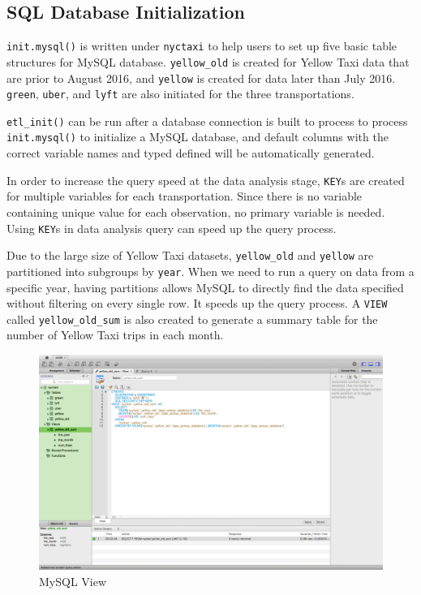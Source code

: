 \documentclass[12pt,twoside]{reedthesis}
\newenvironment{Shaded}{\begin{snugshade}}{\end{snugshade}}
\newcommand{\KeywordTok}[1]{\textcolor[rgb]{0.13,0.29,0.53}{\textbf{#1}}}
\newcommand{\StringTok}[1]{\textcolor[rgb]{0.31,0.60,0.02}{#1}}
\newcommand{\OperatorTok}[1]{\textcolor[rgb]{0.81,0.36,0.00}{\textbf{#1}}}
\newcommand{\NormalTok}[1]{#1}
\theoremstyle{definition}
\theoremstyle{definition}
\theoremstyle{definition}
\theoremstyle{remark}
\begin{document}
\subsection{SQL Database
Initialization}\label{sql-database-initialization}

\texttt{init.mysql()} is written under \texttt{nyctaxi} to help users to
set up five basic table structures for MySQL database.
\texttt{yellow\_old} is created for Yellow Taxi data that are prior to
August 2016, and \texttt{yellow} is created for data later than July
2016. \texttt{green}, \texttt{uber}, and \texttt{lyft} are also
initiated for the three transportations.

\texttt{etl\_init()} can be run after a database connection is built to
process to process \texttt{init.mysql()} to initialize a MySQL database,
and default columns with the correct variable names and typed defined
will be automatically generated.
\begin{Shaded}
\end{Shaded}
In order to increase the query speed at the data analysis stage,
\texttt{KEY}s are created for multiple variables for each
transportation. Since there is no variable containing unique value for
each observation, no primary variable is needed. Using \texttt{KEY}s in
data analysis query can speed up the query process.

Due to the large size of Yellow Taxi datasets, \texttt{yellow\_old} and
\texttt{yellow} are partitioned into subgroups by \texttt{year}. When we
need to run a query on data from a specific year, having partitions
allows MySQL to directly find the data specified without filtering on
every single row. It speeds up the query process. A \texttt{VIEW} called
\texttt{yellow\_old\_sum} is also created to generate a summary table
for the number of Yellow Taxi trips in each month.
\begin{figure}

{\centering \includegraphics[width=5.76in]{figure/mysql_view} 

}

\caption{MySQL View}\label{fig:unnamed-chunk-21}
\end{figure}
\end{document}
